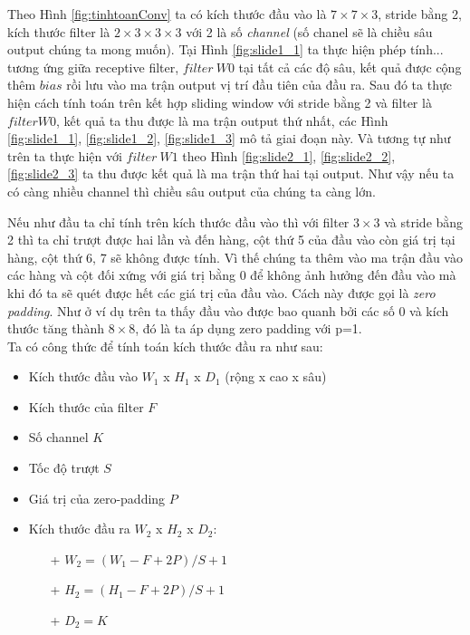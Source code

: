 Theo Hình \ref{fig:tinhtoanConv} ta có kích thước đầu vào là $7 \times 7\times 3$, stride bằng 2, kích thước filter là  $2\times 3\times 3 \times 3$ với 2 là số \textit{channel} (số chanel sẽ là chiều sâu output chúng ta mong muốn). Tại Hình \ref{fig:slide1_1} ta  thực hiện phép tính... tương ứng giữa receptive filter, $filter ~W0$ tại tất cả các độ sâu, kết quả được cộng thêm $bias$ rồi lưu vào ma trận output vị trí đầu tiên của đầu ra. Sau đó ta thực hiện cách tính toán trên kết hợp sliding window với stride bằng 2 và filter là $filter W0$, kết quả ta thu được là ma trận output thứ nhất, các Hình \ref{fig:slide1_1}, \ref{fig:slide1_2}, \ref{fig:slide1_3} mô tả giai đoạn này. Và tương tự như trên ta thực hiện với $filter ~W1$ theo Hình \ref{fig:slide2_1}, \ref{fig:slide2_2}, \ref{fig:slide2_3} ta thu được kết quả là ma trận thứ hai tại output. Như vậy nếu ta có càng nhiều channel thì chiều sâu output của chúng ta càng lớn. \par

Nếu như đầu ta chỉ tính trên kích thước đầu vào thì với filter $3\times 3$ và stride bằng 2 thì ta chỉ trượt được hai lần và đến hàng, cột thứ 5 của đầu vào còn giá trị tại hàng, cột thứ 6, 7 sẽ không được tính. Vì thế chúng ta thêm vào ma trận đầu vào các hàng và cột đối xứng với giá trị bằng 0 để không ảnh hưởng đến đầu vào mà khi đó ta sẽ quét được hết các giá trị của đầu vào. Cách này được gọi là \textit{zero padding}. Như ở ví dụ trên ta thấy đầu vào được bao quanh bởi các số 0 và kích thước tăng thành $8 \times 8$, đó là ta áp dụng zero padding với p=1.\\
Ta có công thức để tính toán kích thước đầu ra như sau:
\begin{itemize}
	\item Kích thước đầu vào \textbf{$W_1$} x \textbf{$H_1$} x \textbf{$D_1$} (rộng x cao x sâu)
	\item Kích thước của filter \textbf{$F$}
	\item Số channel \textbf{$K$}
	\item Tốc độ trượt \textbf{$S$}
	\item Giá trị của zero-padding \textbf{$P$}
	\item Kích thước đầu ra \textbf{$W_2$} x \textbf{$H_2$} x \textbf{$D_2$}:
	\begin{itemize}
		\item[+]  \textbf{$W_2 = (W_1 - F+ 2P)/S +1$}
		\item[+] \textbf{$H_2 = (H_1 - F+ 2P)/S +1$}
		\item[+] \textbf{$D_2 = K$}
	\end{itemize}	 
\end{itemize}	

